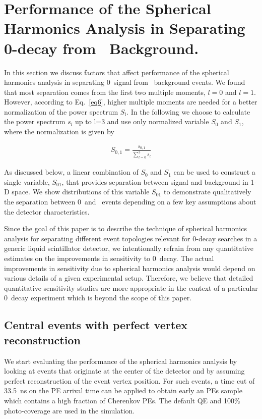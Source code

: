 \section{Performance of the Spherical Harmonics Analysis in Separating 0\nbb-decay from \B~Background.}
\label{sec:performance}

In this section we discuss factors that affect performance of the spherical harmonics analysis in separating
0\nbb~signal from \B~background events. We found that most separation comes from the first two multiple moments,
$l=0$ and $l=1$. However, according to Eq.~\ref{eq6}, higher multiple moments are needed for a better normalization of the 
power spectrum $S_l$. In the following we choose to calculate the power spectrum $s_l$ up to l=3 and
use only normalized variable $S_0$ and $S_1$, where the normalization is given by

\begin{eqnarray}
\label{eq7}
S_{0,1} = \frac{s_{0,1}}{\sum_{l=0}^{3} s_l}
\end{eqnarray}

As discussed below, a linear combination of $S_0$ and $S_1$ can be used to construct a single variable, $S_{01}$, that provides 
separation between signal and background in 1-D space. We show distributions of this variable $S_{01}$ to demonstrate qualitatively 
the separation between 0\nbb~and \B~events depending on a few key assumptions about the detector characteristics.

Since the goal of this paper is to describe the technique of spherical harmonics analysis for separating
different event topologies relevant for 0\nbb-decay searches in a generic liquid scintillator detector, we intentionally refrain from any 
quantitative estimates on the improvements in sensitivity to 0\nbb~decay. The actual improvements in sensitivity due to spherical 
harmonics analysis would depend on various details of a given experimental setup. Therefore, we believe that detailed quantitative 
sensitivity studies are more appropriate in the context of a particular 0\nbb~decay experiment which is beyond the scope of this paper.

\subsection{Central events with perfect vertex reconstruction}

We start evaluating the performance of the spherical harmonics analysis by looking at events that originate at the center
of the detector and by assuming perfect reconstruction of the event vertex position. For such events, a time cut of 33.5~ns on 
the PE arrival time can be applied to obtain early an PEs sample which contains a high fraction of Cherenkov PEs. The default QE and 100\% 
photo-coverage are used in the simulation.

